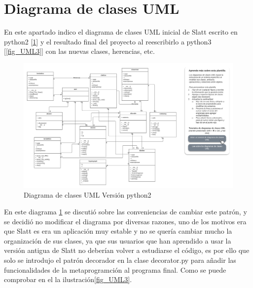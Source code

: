 \documentclass{cosas/tfg_domingo}
\begin{document}
\newpage

\section{Diagrama de clases UML}
En este apartado indico el diagrama de clases UML inicial de Slatt escrito en python2 [\ref{fig_UML2}] y el resultado final del proyecto al reescribirlo a python3 [\ref{fig_UML3}] con las nuevas clases, herencias, etc.


\begin{figure}[ht!] %
\begin{center}
\includegraphics[width=1.5\linewidth]{imagenes/Diagrama en blanco - Clase UML (1).png}
\end{center}
\caption{Diagrama de clases UML Versión python2}
\label{fig_UML2}
\end{figure}

En este diagrama \ref{fig_UML2} se discutió sobre las conveniencias de cambiar este patrón, y se decidió no modificar el diagrama por diversas razones, uno de los motivos era que Slatt es era un aplicación muy estable y no se quería cambiar mucho la organización de sus clases, ya que sus usuarios que han aprendido a usar la versión antigua de Slatt no deberían volver a estudiarse el código, es por ello que solo se introdujo el patrón decorador en la clase decorator.py para añadir las funcionalidades de la metaprogramción al programa final. Como se puede comprobar en el la ilustración\ref{fig_UML3}.
\newpage
\end{document}
